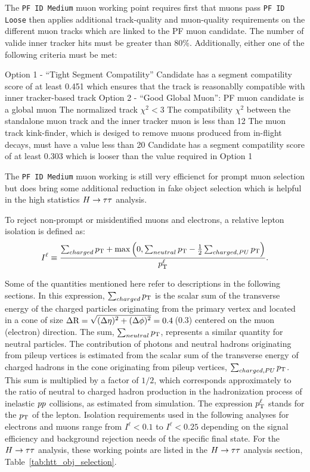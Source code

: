 The \texttt{PF ID Medium} muon working point requires first that muons pass \texttt{PF ID Loose} then
applies additional track-quality and muon-quality requirements on the different muon tracks which are
linked to the PF muon candidate. The number of valide inner tracker
hits must be greater than 80\%. Additionally, either one of the following criteria must be met:
\begin{outline}
\1 Option 1 - ``Tight Segment Compatility''
    \2 Candidate has a segment compatility score of at least 0.451 which ensures that the 
track is reasonablly compatible with inner tracker-based track
\1 Option 2 - ``Good Global Muon'':
    \2 PF muon candidate is a global muon
    \2 The normalized track $\chi^2 < 3$
    \2 The compatibility $\chi^2$ between the standalone muon track and the inner tracker muon is
less than 12
    \2 The muon track kink-finder, which is desiged to remove muons produced from in-flight decays, 
must have a value less than 20
    \2 Candidate has a segment compatility score of at least 0.303 which is looser than the value
required in Option 1
\end{outline}
The \texttt{PF ID Medium} muon working is still very efficienct for prompt muon selection but
does bring some additional reduction in fake object selection which is helpful in the high
statistics $H\to\tau\tau$ analysis. 

To reject non-prompt or misidentified muons and electrons, a relative lepton isolation is defined as:
\begin{equation}
I^{\ell} \equiv \frac{\sum_{charged}  p_\mathrm{T} + \max\left( 0, \sum_{neutral}  p_\mathrm{T}
                                         - \frac{1}{2} \sum_{charged, PU} p_\mathrm{T}  \right )}{p_\mathrm{T}^{\ell}}.
\label{eq:rel_isolation}
\end{equation}

Some of the quantities mentioned here refer to descriptions in the following sections.
In this expression, $\sum_{charged}  p_\mathrm{T}$ is the scalar sum of the transverse energy of the 
charged particles originating from the primary vertex and located in a cone of size
$\Delta \mathrm{R} = \sqrt{\smash[b]{(\Delta \eta)^2 + (\Delta \phi)^2}} = 0.4$\,(0.3)
centered on the muon (electron) direction. The sum, $\sum_{neutral}  p_\mathrm{T}$, represents
a similar quantity for neutral particles. The contribution of photons and neutral hadrons 
originating from pileup vertices is estimated from the scalar sum of the transverse
energy of charged hadrons in the cone originating from pileup vertices,
$\sum_{charged, PU} p_\mathrm{T}$. This sum is multiplied by a factor of $1/2$, which corresponds 
approximately to the ratio of neutral to charged hadron production in the hadronization process
of inelastic $pp$ collisions, as estimated from simulation. The expression $p_\mathrm{T}^{\ell}$ 
stands for the $p_\mathrm{T}$ of the lepton. Isolation requirements used in the following analyses
for electrons and muons range from $I^{\ell} < 0.1$ to $I^{\ell} < 0.25$ depending on the signal efficiency and
background rejection needs of the specific final state. For the $H\to\tau\tau$ analysis, these
working points are listed in the $H\to\tau\tau$ analysis section, Table~\ref{tab:htt_obj_selection}.


